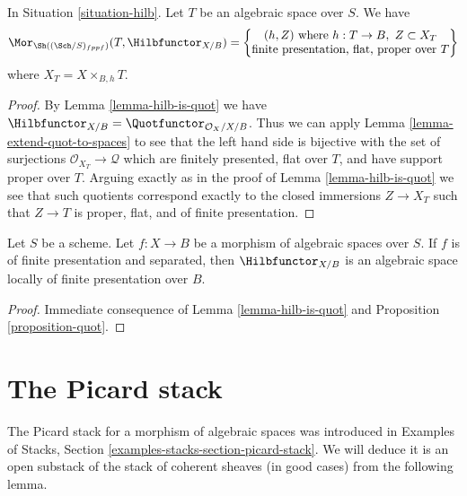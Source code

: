 \begin{lemma}
\label{lemma-extend-hilb-to-spaces}
In Situation \ref{situation-hilb}. Let $T$ be an algebraic space over $S$.
We have
$$
\Mor_{\Sh((\Sch/S)_{fppf})}(T, \Hilbfunctor_{X/B}) =
\left\{
\begin{matrix}
(h, Z)\text{ where }h : T \to B,\ Z \subset X_T \\
\text{finite presentation, flat, proper over }T
\end{matrix}
\right\}
$$
where $X_T = X \times_{B, h} T$.
\end{lemma}

\begin{proof}
By Lemma \ref{lemma-hilb-is-quot}
we have $\Hilbfunctor_{X/B} = \Quotfunctor_{\mathcal{O}_X/X/B}$.
Thus we can apply Lemma \ref{lemma-extend-quot-to-spaces}
to see that the left hand side is bijective with the set
of surjections $\mathcal{O}_{X_T} \to \mathcal{Q}$
which are finitely presented, flat over $T$, and
have support proper over $T$. Arguing exactly as in the
proof of Lemma \ref{lemma-hilb-is-quot}
we see that such quotients correspond
exactly to the closed immersions $Z \to X_T$ such that
$Z \to T$ is proper, flat, and of finite presentation.
\end{proof}

\begin{proposition}
\label{proposition-hilb}
Let $S$ be a scheme. Let $f : X \to B$ be a morphism of algebraic
spaces over $S$. If $f$ is of finite presentation and separated, then
$\Hilbfunctor_{X/B}$ is an algebraic space locally of finite
presentation over $B$.
\end{proposition}

\begin{proof}
Immediate consequence of
Lemma \ref{lemma-hilb-is-quot}
and Proposition \ref{proposition-quot}.
\end{proof}






\section{The Picard stack}
\label{section-picard-stack}

\noindent
The Picard stack for a morphism of algebraic spaces was introduced
in Examples of Stacks, Section \ref{examples-stacks-section-picard-stack}.
We will deduce it is an open substack of the stack of coherent sheaves
(in good cases) from the following lemma.


